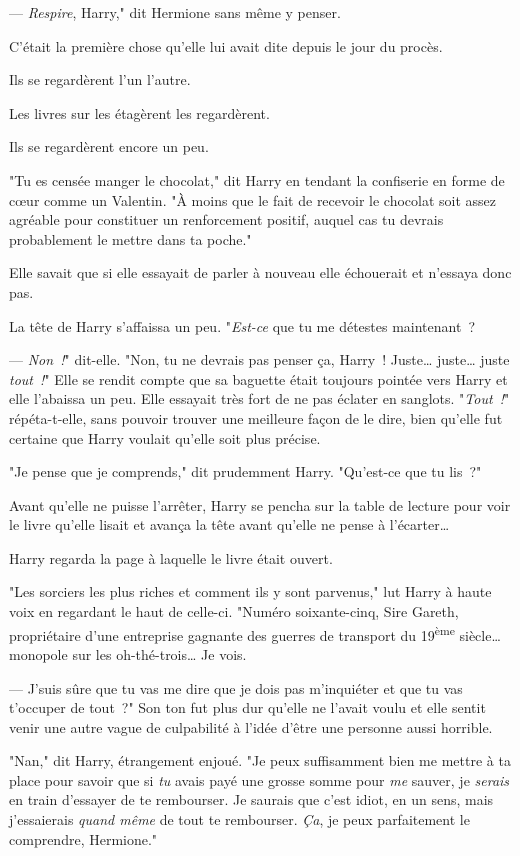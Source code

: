 --- \emph{Respire}, Harry," dit Hermione sans même y penser.

C'était la première chose qu'elle lui avait dite depuis le jour du procès.

Ils se regardèrent l'un l'autre.

Les livres sur les étagèrent les regardèrent.

Ils se regardèrent encore un peu.

"Tu es censée manger le chocolat," dit Harry en tendant la confiserie en forme de cœur comme un Valentin. "À moins que le fait de recevoir le chocolat soit assez agréable pour constituer un renforcement positif, auquel cas tu devrais probablement le mettre dans ta poche."

Elle savait que si elle essayait de parler à nouveau elle échouerait et n'essaya donc pas.

La tête de Harry s'affaissa un peu. "\emph{Est-ce} que tu me détestes maintenant~?

--- \emph{Non~!}" dit-elle. "Non, tu ne devrais pas penser ça, Harry~! Juste… juste… juste \emph{tout~!}" Elle se rendit compte que sa baguette était toujours pointée vers Harry et elle l'abaissa un peu. Elle essayait très fort de ne pas éclater en sanglots. "\emph{Tout~!}" répéta-t-elle, sans pouvoir trouver une meilleure façon de le dire, bien qu'elle fut certaine que Harry voulait qu'elle soit plus précise.

"Je pense que je comprends," dit prudemment Harry. "Qu'est-ce que tu lis~?"

Avant qu'elle ne puisse l'arrêter, Harry se pencha sur la table de lecture pour voir le livre qu'elle lisait et avança la tête avant qu'elle ne pense à l'écarter…

Harry regarda la page à laquelle le livre était ouvert.

"Les sorciers les plus riches et comment ils y sont parvenus," lut Harry à haute voix en regardant le haut de celle-ci. "Numéro soixante-cinq, Sire Gareth, propriétaire d'une entreprise gagnante des guerres de transport du 19\textsuperscript{ème} siècle… monopole sur les oh-thé-trois… Je vois.

--- J'suis sûre que tu vas me dire que je dois pas m'inquiéter et que tu vas t'occuper de tout~?" Son ton fut plus dur qu'elle ne l'avait voulu et elle sentit venir une autre vague de culpabilité à l'idée d'être une personne aussi horrible.

"Nan," dit Harry, étrangement enjoué. "Je peux suffisamment bien me mettre à ta place pour savoir que si \emph{tu} avais payé une grosse somme pour \emph{me} sauver, je \emph{serais} en train d'essayer de te rembourser. Je saurais que c'est idiot, en un sens, mais j'essaierais \emph{quand même} de tout te rembourser. \emph{Ça}, je peux parfaitement le comprendre, Hermione."

